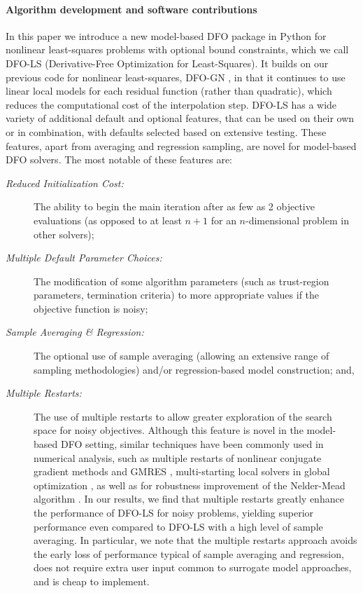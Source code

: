 \paragraph{Algorithm development and software contributions}
In this paper we introduce a new model-based DFO package in Python for nonlinear least-squares problems with optional bound constraints, which we call DFO-LS (Derivative-Free Optimization for Least-Squares). It builds on our previous code for nonlinear least-squares, DFO-GN \cite{Cartis2017a}, in that it continues to use linear local models for each residual function (rather than quadratic), which reduces the computational cost of the interpolation step.
DFO-LS has a wide variety of additional default and optional features,  that can be used on their own or in combination, with defaults selected based on extensive testing. These features,
apart from averaging and regression sampling, are novel for model-based DFO solvers. 
The most notable of these features are:
\begin{description}
	\item[\normalfont\textit{Reduced Initialization Cost:}] The ability to begin the main iteration after as few as 2 objective evaluations (as opposed to at least $n+1$ for an $n$-dimensional problem in other solvers);
	\item[\normalfont\textit{Multiple Default Parameter Choices:}] The modification of some algorithm parameters (such as trust-region parameters, termination criteria) to more appropriate values if the objective function is noisy;
	\item[\normalfont\textit{Sample Averaging \& Regression:}] The optional use of sample averaging (allowing an extensive range of sampling methodologies) and/or regression-based model construction; and,
	\item[\normalfont\textit{Multiple Restarts:}] The use of multiple restarts to allow greater exploration of the search space for noisy objectives. Although this feature is novel in the model-based DFO setting, similar techniques have been commonly used in numerical analysis, such as  multiple restarts of nonlinear conjugate gradient methods \cite[Chapter 5]{Nocedal2006} and GMRES \cite[Chapter 6]{Demmel1997},  multi-starting local solvers  in global optimization \cite{Locatelli2013}, as well as for  robustness improvement of the Nelder-Mead algorithm \cite{Kelley1999}. In our results, we find that multiple restarts greatly enhance the performance of DFO-LS for noisy problems, yielding superior performance even compared to DFO-LS with a high level of sample averaging. In particular, we note that the multiple restarts approach avoids the early loss of performance typical of sample averaging and regression, 
does not require extra user input common to  surrogate model approaches,	and is cheap to implement.	
\end{description}
